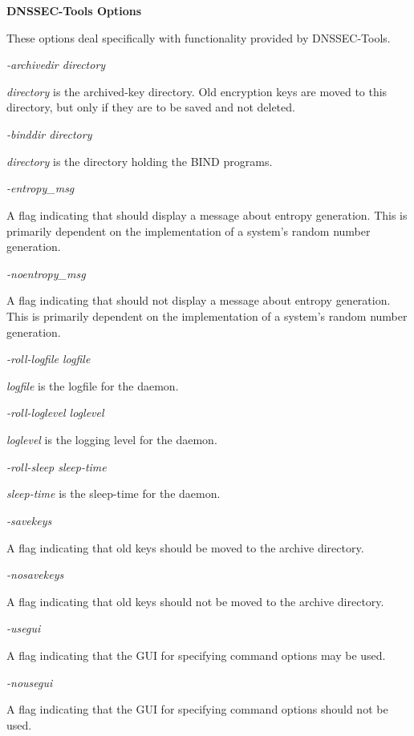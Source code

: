 {\bf DNSSEC-Tools Options}

These options deal specifically with functionality provided by DNSSEC-Tools.

\begin{description}

\item {\it -archivedir directory}\verb" "

{\it directory} is the archived-key directory.  Old encryption keys are moved
to this directory, but only if they are to be saved and not deleted.

\item {\it -binddir directory}\verb" "

{\it directory} is the directory holding the BIND programs.

\item {\it -entropy\_msg}\verb" "

A flag indicating that  should display a message about entropy
generation.  This is primarily dependent on the implementation of a system's
random number generation.

\item {\it -noentropy\_msg}\verb" "

A flag indicating that  should not display a message about
entropy generation.  This is primarily dependent on the implementation of
a system's random number generation.

\item {\it -roll-logfile logfile}\verb" "

{\it logfile} is the logfile for the  daemon.

\item {\it -roll-loglevel loglevel}\verb" "

{\it loglevel} is the logging level for the  daemon.

\item {\it -roll-sleep sleep-time}\verb" "

{\it sleep-time} is the sleep-time for the  daemon.

\item {\it -savekeys}\verb" "

A flag indicating that old keys should be moved to the archive directory.

\item {\it -nosavekeys}\verb" "

A flag indicating that old keys should not be moved to the archive directory.

\item {\it -usegui}\verb" "

A flag indicating that the GUI for specifying command options may be used.

\item {\it -nousegui}\verb" "

A flag indicating that the GUI for specifying command options should not be
used.

\end{description}

